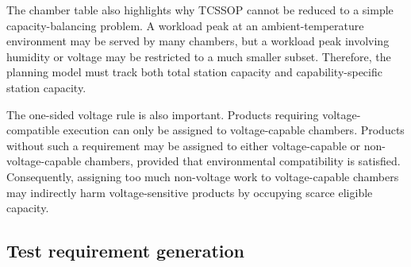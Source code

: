\documentclass[11pt]{article}
\begin{document}
The chamber table also highlights why TCSSOP cannot be reduced to a simple capacity-balancing problem. A workload peak at an ambient-temperature environment may be served by many chambers, but a workload peak involving humidity or voltage may be restricted to a much smaller subset. Therefore, the planning model must track both total station capacity and capability-specific station capacity.

The one-sided voltage rule is also important. Products requiring voltage-compatible execution can only be assigned to voltage-capable chambers. Products without such a requirement may be assigned to either voltage-capable or non-voltage-capable chambers, provided that environmental compatibility is satisfied. Consequently, assigning too much non-voltage work to voltage-capable chambers may indirectly harm voltage-sensitive products by occupying scarce eligible capacity.

\subsection{Test requirement generation}
\label{subsec:req_generation}
\end{document}
